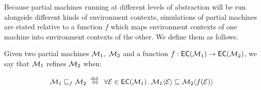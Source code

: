 Because partial machines
running at different levels of abstraction
will be run alongside different kinds of environment contexts,
simulations of partial machines are stated relative to
a function $f$ which maps
environment contexts of one machine into
environment contexts of the other.
We define them as follows.

\begin{definition}
Given two partial machines $\mathcal{M}_1$, $\mathcal{M}_2$ and
a function $f : {{\mathsf{EC}}({\mathcal{M}_1})} \rightarrow {{\mathsf{EC}}({\mathcal{M}_2})}$,
we say that $\mathcal{M}_1$ refines $\mathcal{M}_2$ when:
\begin{small}
\[ \Mach_1 \refines_f \Mach_2
	\ \stackrel{\text{def.}}{\Leftrightarrow}\ 
	\forall \Env \in \EC{\Mach_1} \,.\,
		\Mach_1 \langle \Env \rangle \refines
		\Mach_2 \langle f(\Env) \rangle \]
\end{small}
\end{definition}

%

